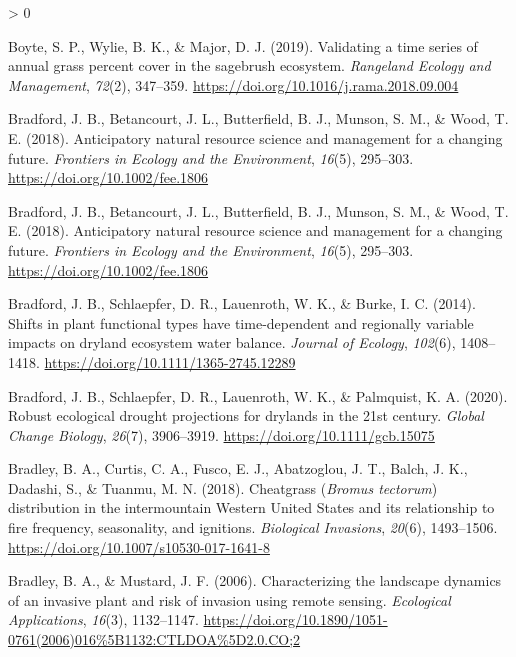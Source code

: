 \documentclass[
  11pt,
  a4paper,
]{article}
\newlength{\cslhangindent}
\newenvironment{CSLReferences}[2] %
 {%
  \setlength{\parindent}{0pt}
  \ifodd #1 \everypar{\setlength{\hangindent}{\cslhangindent}}\ignorespaces\fi
  \ifnum #2 > 0
  \setlength{\parskip}{#2\baselineskip}
  \fi
 }%
 {}
\begin{document}
\begin{CSLReferences}{1}{0}
\leavevmode\hypertarget{ref-Boyte2019}{}%
Boyte, S. P., Wylie, B. K., \& Major, D. J. (2019). {Validating a time series of annual grass percent cover in the sagebrush ecosystem}. \emph{Rangeland Ecology and Management}, \emph{72}(2), 347--359. \url{https://doi.org/10.1016/j.rama.2018.09.004}

\leavevmode\hypertarget{ref-Bradford2018}{}%
Bradford, J. B., Betancourt, J. L., Butterfield, B. J., Munson, S. M., \& Wood, T. E. (2018). {Anticipatory natural resource science and management for a changing future}. \emph{Frontiers in Ecology and the Environment}, \emph{16}(5), 295--303. \url{https://doi.org/10.1002/fee.1806}

\leavevmode\hypertarget{ref-Bradford2018}{}%
Bradford, J. B., Betancourt, J. L., Butterfield, B. J., Munson, S. M., \& Wood, T. E. (2018). {Anticipatory natural resource science and management for a changing future}. \emph{Frontiers in Ecology and the Environment}, \emph{16}(5), 295--303. \url{https://doi.org/10.1002/fee.1806}

\leavevmode\hypertarget{ref-Bradford2014}{}%
Bradford, J. B., Schlaepfer, D. R., Lauenroth, W. K., \& Burke, I. C. (2014). {Shifts in plant functional types have time-dependent and regionally variable impacts on dryland ecosystem water balance}. \emph{Journal of Ecology}, \emph{102}(6), 1408--1418. \url{https://doi.org/10.1111/1365-2745.12289}

\leavevmode\hypertarget{ref-Bradford2020}{}%
Bradford, J. B., Schlaepfer, D. R., Lauenroth, W. K., \& Palmquist, K. A. (2020). Robust ecological drought projections for drylands in the 21st century. \emph{Global Change Biology}, \emph{26}(7), 3906--3919. \url{https://doi.org/10.1111/gcb.15075}

\leavevmode\hypertarget{ref-Bradley2018}{}%
Bradley, B. A., Curtis, C. A., Fusco, E. J., Abatzoglou, J. T., Balch, J. K., Dadashi, S., \& Tuanmu, M. N. (2018). {Cheatgrass (\emph{Bromus tectorum}) distribution in the intermountain Western United States and its relationship to fire frequency, seasonality, and ignitions}. \emph{Biological Invasions}, \emph{20}(6), 1493--1506. \url{https://doi.org/10.1007/s10530-017-1641-8}

\leavevmode\hypertarget{ref-Bradley2006}{}%
Bradley, B. A., \& Mustard, J. F. (2006). {Characterizing the landscape dynamics of an invasive plant and risk of invasion using remote sensing}. \emph{Ecological Applications}, \emph{16}(3), 1132--1147. \url{https://doi.org/10.1890/1051-0761(2006)016\%5B1132:CTLDOA\%5D2.0.CO;2}


\end{CSLReferences}
\end{document}
